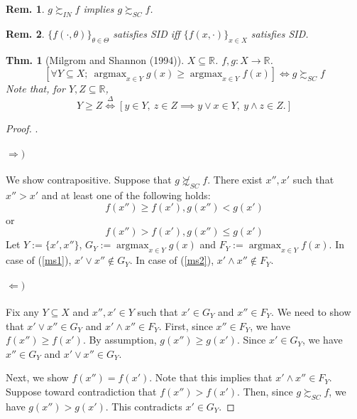 \documentclass[11pt,a4paper,dvipdfmx]{article}
\theoremstyle{plain}
\newtheorem{thm}{Thm.}[section]
\newtheorem{rem}{Rem.}[section]
\newcommand{\R}{\mathbb{R}}
\newcommand{\defi}{\stackrel{\Delta}{\Longleftrightarrow}}
\newcommand{\equi}{\Longleftrightarrow}
\newcommand{\1}{\mathbbm{1}}
\DeclareMathOperator*{\argmax}{argmax}
\begin{document}
\begin{rem}
	$g \succsim_{IN} f$ implies $g \succsim_{SC} f$.
\end{rem}
\begin{rem}
	$\{f(\cdot, \theta)\}_{\theta \in \Theta}$ satisfies SID iff $\{f(x, \cdot)\}_{x \in X}$ satisfies SID.
\end{rem}

\begin{thm}[Milgrom and Shannon (1994)]
	$X \subseteq \R$. $f,g: X \to \R$.
	\[
	[\forall Y \subseteq X; \ \argmax_{x \in Y} g(x) \geq \argmax_{x \in Y} f(x)
	]
	\equi g \succsim_{SC} f
	\]
	Note that, for $Y,Z \subseteq \R$,
	\[
	Y \geq Z
	\defi  [y \in Y, \ z \in Z
	\implies y \vee x \in Y, \ y \wedge z \in Z.
	]
	\]
\end{thm}
\begin{proof}.
	\paragraph{$\Rightarrow)$}
	We show contrapositive. Suppose that $g \not\succsim_{SC} f$.
	There exist $x'', x'$ such that $x'' > x'$ and at least one of the following holds:
	\begin{equation}
		f(x'') \geq f(x'), g(x'') < g(x') \label{ms1}
	\end{equation}
	or
	\begin{equation}
		f(x'') > f(x'), g(x'') \leq g(x') \label{ms2}
	\end{equation}
	Let $Y := \{x', x''\}$, $G_Y := \argmax_{x \in Y} g(x)$ and $F_Y := \argmax_{x \in Y} f(x)$.
	In case of (\ref{ms1}), $x' \vee x'' \notin G_Y$. In case of (\ref{ms2}), $x' \wedge x'' \notin F_Y$.
	
	\paragraph{$\Leftarrow)$}
	Fix any $Y \subseteq X$ and $x'', x' \in Y$ such that $x' \in G_Y$ and $x'' \in F_Y$. We need to show that $x' \vee x'' \in G_Y$ and $x' \wedge x'' \in F_Y$.
	First, since $x'' \in F_Y$, we have $f(x'') \geq f(x')$. By assumption, $g(x'') \geq g(x')$. Since $x' \in G_Y$, we have $x'' \in G_Y$ and $x' \vee x'' \in G_Y$.
	
	Next, we show $f(x'') = f(x')$. Note that this implies that $x' \wedge x'' \in F_Y$. 
	Suppose toward contradiction that $f(x'') > f(x')$. Then, since $g \succsim_{SC} f$, we have $g(x'') > g(x')$. This contradicts $x' \in G_Y$.
\end{proof}
\end{document}
